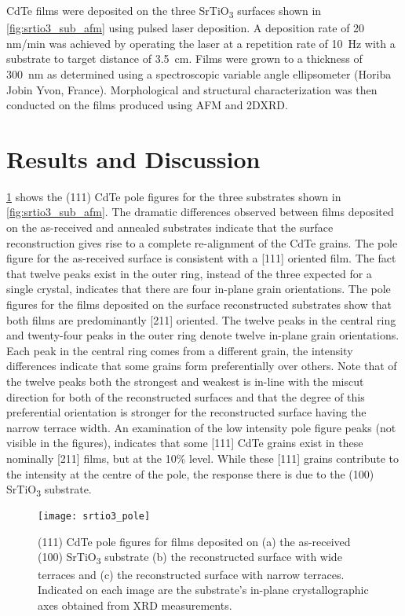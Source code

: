 CdTe films were deposited on the three SrTiO\textsubscript{3} surfaces shown in \cref{fig:srtio3_sub_afm} using pulsed laser deposition.
A deposition rate of 20 nm/min was achieved by operating the laser at a repetition rate of 10~Hz with a substrate to target distance of 3.5~cm.
Films were grown to a thickness of 300~nm as determined using a spectroscopic variable angle ellipsometer (Horiba Jobin Yvon, France).
Morphological and structural characterization was then conducted on the films produced using AFM and 2DXRD\@.
\section{Results and Discussion}
\cref{fig:srtio3_pole} shows the (111) CdTe pole figures for the three substrates shown in \cref{fig:srtio3_sub_afm}.
The dramatic differences observed between films deposited on the as-received and annealed substrates indicate that the surface reconstruction gives rise to a complete re-alignment of the CdTe grains.
The pole figure for the as-received surface is consistent with a [111] oriented film.
The fact that twelve peaks exist in the outer ring, instead of the three expected for a single crystal, indicates that there are four in-plane grain orientations.
The pole figures for the films deposited on the surface reconstructed substrates show that both films are predominantly [211] oriented.
The twelve peaks in the central ring and twenty-four peaks in the outer ring denote twelve in-plane grain orientations.
Each peak in the central ring comes from a different grain, the intensity differences indicate that some grains form preferentially over others.
Note that of the twelve peaks both the strongest and weakest is in-line with the miscut direction for both of the reconstructed surfaces and that the degree of this preferential orientation is stronger for the reconstructed surface having the narrow terrace width.
An examination of the low intensity pole figure peaks (not visible in the figures), indicates that some [111] CdTe grains exist in these nominally [211] films, but at the 10\% level.
While these [111] grains contribute to
the intensity at the centre of the pole, the response there is due to the (100) SrTiO\textsubscript{3} substrate.
\begin{figure}
 \centering \texttt{[image: srtio3\_pole]}
 \caption[Pole figures of CdTe grown on SrTiO\textsubscript{3}]{\label{fig:srtio3_pole}(111) CdTe pole figures for films deposited on (a) the as-received (100) SrTiO\textsubscript{3} substrate (b) the reconstructed surface with wide terraces and (c) the reconstructed surface with narrow terraces.
  Indicated on each image are the substrate’s in-plane crystallographic axes obtained from XRD measurements.}
\end{figure}
